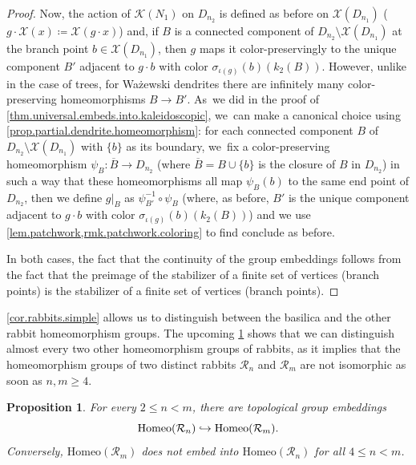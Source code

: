 \documentclass[JEP,XML,SOM,Unicode,NoFloatCountersInSection,published]{cedram}
\newcommand\hto{\mathrel{\lhook\joinrel\to}}
\theoremstyle{plain}
\newtheorem{proposition}[theorem]{Proposition}
\theoremstyle{definition}
\theoremstyle{remark}
\newcommand{\Homeo}{\mathrm{Homeo}}
\newcommand{\R}{\mathcal{R}}
\newcommand{\K}{\mathcal{K}}
\newcommand{\Chi}{\mathcal{X}}
\begin{document}
\begin{proof}
Now, the action of $\K(N_1)$ on $D_{n_2}$ is defined as before on $\Chi(D_{n_1})$ (\ie $g \cdot \Chi(x) \coloneqq \Chi(g \cdot x)$) and, if $B$ is a connected component of $D_{n_2} \setminus \Chi(D_{n_1})$ at the branch point $b \in \Chi(D_{n_1})$, then $g$ maps it color-preservingly to the unique component $B'$ adjacent to $g \cdot b$ with color $\sigma_{\iota(g)}(b)\left(k_2(B)\right)$.
However, unlike in the case of trees, for Ważewski dendrites there are infinitely many color-preserving homeomorphisms $B \to B'$. As~we did in the proof of \cref{thm.universal.embeds.into.kaleidoscopic}, we~can make a canonical choice using \cref{prop.partial.dendrite.homeomorphism}:
for each connected component $B$ of $D_{n_2} \setminus \Chi(D_{n_1})$ with $\{b\}$ as its boundary, we~fix a color-preserving homeomorphism $\psi_B \colon \overline{B} \to D_{n_2}$ (where $\overline{B} = B \cup \{b\}$ is the closure of $B$ in $D_{n_2}$) in such a way that these homeomorphisms all map $\psi_B(b)$ to the same end point of $D_{n_2}$, then we define $g|_B$ as $\psi_{B'}^{-1} \circ \psi_B$ (where, as before, $B'$ is the unique component adjacent to $g \cdot b$ with color $\sigma_{\iota(g)}(b)\left(k_2(B)\right)$) and we use \cref{lem.patchwork,rmk.patchwork.coloring} to find conclude as before.

In both cases, the fact that the continuity of the group embeddings follows from the fact that the preimage of the stabilizer of a finite set of vertices (branch points) is the stabilizer of a finite set of vertices (branch points).
\end{proof}

\cref{cor.rabbits.simple} allows us to distinguish between the basilica and the other rabbit homeomorphism groups.
The upcoming \cref{prop.rabbit.embeddings} shows that we can distinguish almost every two other homeomorphism groups of rabbits, as it implies that the homeomorphism groups of two distinct rabbits $\R_n$ and $\R_m$ are not isomorphic as soon as $n, m \geq 4$.

\begin{proposition}
\label{prop.rabbit.embeddings}
For every $2 \leq n < m$, there are topological group embeddings
\[
 \Homeo(\R_n) \hto \Homeo(\R_m). 
\]
Conversely, $\Homeo(\R_m)$ does not embed into $\Homeo(\R_n)$ for all $4 \leq n < m$.
\end{proposition}
\end{document}
